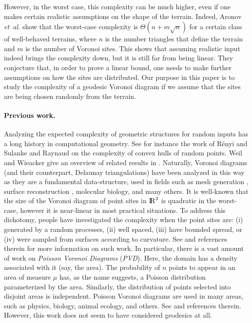\documentclass[12pt]{article}
\newcommand{\Term}[1]{\textsf{#1}}
\newcommand{\PVD}{\Term{PVD}\xspace}
\renewcommand{\Re}{{\rm I\!\hspace{-0.025em} R}}
\newcommand{\etal}{\textit{et~al.}\xspace}
\newcommand{\Renyi}{R{\'e}nyi\xspace}
\begin{document}
However, in the worst case, this complexity can be much higher, even
if one makes certain realistic assumptions on the shape of the
terrain.  Indeed, Aronov \etal \cite{abt-cbvdrt-08} show that the
worst-case complexity is $\Theta(n+m\sqrt{n})$ for a certain class of
well-behaved terrains, where $n$ is the number triangles that define
the terrain and $m$ is the number of Voronoi sites. This shows that
assuming realistic input indeed brings the complexity down, but it is
still far from being linear.  They conjecture that, in order to prove
a linear bound, one needs to make further assumptions on how the sites
are distributed.  Our purpose in this paper is to study the complexity
of a geodesic Voronoi diagram if we assume that the sites are being
chosen randomly from the terrain.

\paragraph{Previous work.}
Analyzing the expected complexity of geometric structures for random
inputs has a long history in computational geometry. See for instance
the work of \Renyi and Sulanke \cite{rs-udkhv-63} and Raynaud
\cite{r-slcdn-70} on the complexity of convex hulls of random
points. Weil and Wieacker give an overview of related results in
\cite{ww-sg-93}.  Naturally, Voronoi diagrams (and their counterpart,
Delaunay triangulations) have been analyzed in this way as they
are a fundamental data-structure, used in fields such as mesh
generation \cite{r-draqt-95}, surface reconstruction \cite{d-csra-11},
molecular biology, and many others. It is well-known that the size of
the Voronoi diagram of point sites in $\Re^3$ is quadratic in the
worst-case, however it is near-linear in most practical situations. To
address this dichotomy, people have investigated the complexity when
the point sites are: (i) generated by a random processes, (ii) well
spaced, (iii) have bounded spread, or (iv) were sampled from surfaces
according to curvature. See \cite{deg-eeg-08} and references therein
for more information on such work.  In particular, there is a vast
amount of work on \emph{Poisson Voronoi Diagrams}
(\emph{\PVD{}}). Here, the domain has a density associated with it
(say, the area). The probability of $n$ points to appear in an area of
measure $\mu$ has, as the name suggests, a Poisson distribution
parameterized by the area. Similarly, the distribution of points
selected into disjoint areas is independent. Poisson Voronoi diagrams
are used in many areas, such as physics, biology, animal ecology, and
others. See \cite{obsc-stcav-00, jn-osdpv-04} and references
therein. However, this work does not seem to have considered geodesics
at all.
\end{document}
